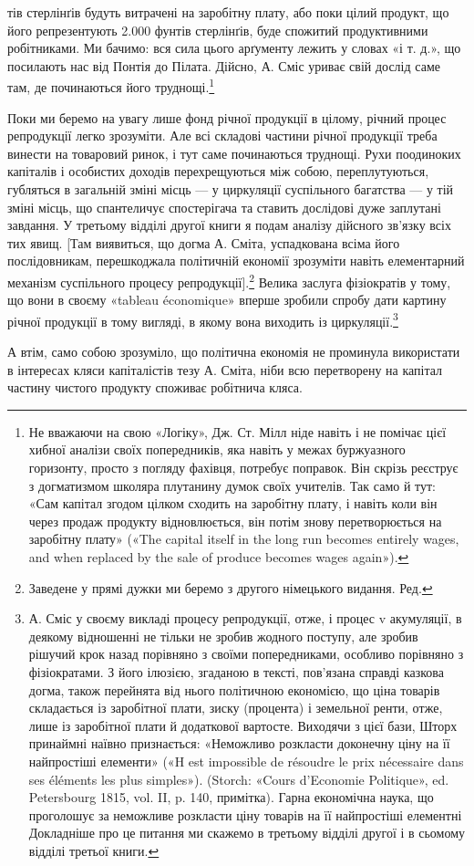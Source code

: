 тів стерлінґів будуть витрачені на заробітну плату, або поки
цілий продукт, що його репрезентують 2.000 фунтів стерлінґів,
буде спожитий продуктивними робітниками. Ми бачимо: вся
сила цього арґументу лежить у словах «і т. д.», що посилають
нас від Понтія до Пілата. Дійсно, А. Сміс уриває свій дослід
саме там, де починаються його труднощі.\footnote{
Не вважаючи на свою «Логіку», Дж. Ст. Мілл ніде навіть і не
помічає цієї хибної аналізи своїх попередників, яка навіть у межах буржуазного
горизонту, просто з погляду фахівця, потребує поправок. Він
скрізь реєструє з догматизмом школяра плутанину думок своїх учителів.
Так само й тут: «Сам капітал згодом цілком сходить на заробітну плату,
і навіть коли він через продаж продукту відновлюється, він потім знову
перетворюється на заробітну плату» («The capital itself in the long run
becomes entirely wages, and when replaced by the sale of produce becomes
wages again»).
}

Поки ми беремо на увагу лише фонд річної продукції в цілому,
річний процес репродукції легко зрозуміти. Але всі складові
частини річної продукції треба винести на товаровий ринок, і
тут саме починаються труднощі. Рухи поодиноких капіталів і
особистих доходів перехрещуються між собою, переплутуються,
губляться в загальній зміні місць — у циркуляції суспільного
багатства — у тій зміні місць, що спантеличує спостерігача та
ставить дослідові дуже заплутані завдання. У третьому відділі
другої книги я подам аналізу дійсного зв’язку всіх тих явищ.
[Там виявиться, що догма А. Сміта, успадкована всіма його послідовникам,
перешкоджала політичній економії зрозуміти навіть
елементарний механізм суспільного процесу репродукції].\footnote*{
Заведене у прямі дужки ми беремо з другого німецького видання.
Ред.
} Велика
заслуга фізіократів у тому, що вони в своєму «tableau économique»
вперше зробили спробу дати картину річної продукції
в тому вигляді, в якому вона виходить із циркуляції.\footnote{
А. Сміс у своєму викладі процесу репродукції, отже, і процес v
акумуляції, в деякому відношенні не тільки не зробив жодного поступу,
але зробив рішучий крок назад порівняно з своїми попередниками, особливо
порівняно з фізіократами. З його ілюзією, згаданою в тексті, пов’язана
справді казкова догма, також перейнята від нього політичною економією,
що ціна товарів складається із заробітної плати, зиску (процента)
і земельної ренти, отже, лише із заробітної плати й додаткової вартосте.
Виходячи з цієї бази, Шторх принаймні наївно признається: «Неможливо
розкласти доконечну ціну на її найпростіші елементи» («H est
impossible de résoudre le prix nécessaire dans ses éléments les plus simples»).
(Storch: «Cours d’Economie Politique», ed. Petersbourg 1815,
vol. II, p. 140, примітка). Гарна економічна наука, що проголошує за
неможливе розкласти ціну товарів на її найпростіші елементні Докладніше
про це питання ми скажемо в третьому відділі другої і в сьомому
відділі третьої книги.
}

А втім, само собою зрозуміло, що політична економія не проминула
використати в інтересах кляси капіталістів тезу А. Сміта,
ніби всю перетворену на капітал частину чистого продукту споживає
робітнича кляса.